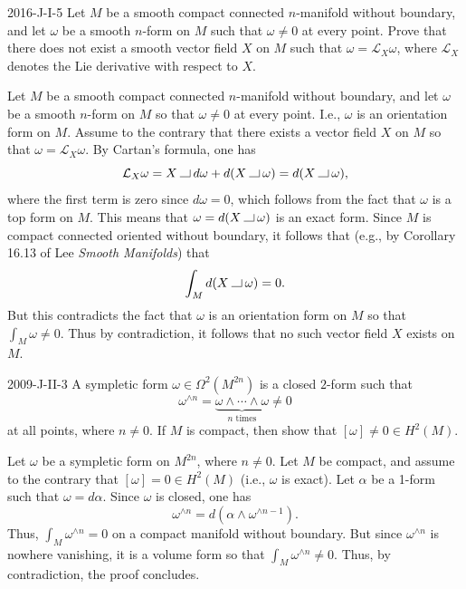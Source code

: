 \documentclass{article}
\newcommand{\contract}{\mathbin{\vrule height 0.4pt width 8pt depth 0pt\vrule height 6pt width 0.4pt depth 0pt}}
\begin{document}
	\begin{prb}{2016-J-I-5}
		Let $M$ be a smooth compact connected $n$-manifold without boundary, and let $\omega$ be a smooth $n$-form on $M$ such that $\omega \neq 0$ at every point. Prove that there does not exist a smooth vector field $X$ on $M$ such that $\omega = \mathcal{L}_{X}\omega$, where $\mathcal{L}_{X}$ denotes the Lie derivative with respect to $X$. 
	\end{prb}
	Let $M$ be a smooth compact connected $n$-manifold without boundary, and let $\omega$ be a smooth $n$-form on $M$ so that $\omega \neq 0$ at every point. I.e., $\omega$ is an orientation form on $M$. Assume to the contrary that there exists a vector field $X$ on $M$ so that $\omega = \mathcal{L}_{X}\omega$. By Cartan's formula, one has 
	\begin{equation*}
		\mathcal{L}_{X}\omega = X \contract d\omega + d(X \contract \omega) = d(X\contract \omega), 
	\end{equation*}
	where the first term is zero since $d\omega = 0$, which follows from the fact that $\omega$ is a top form on $M$. This means that $\omega = d(X \contract \omega)$ is an exact form. Since $M$ is compact connected oriented without boundary, it follows that (e.g., by Corollary 16.13 of Lee \textit{Smooth Manifolds}) that 
	\begin{equation*}
		\int_{M}d(X \contract \omega) = 0. 
	\end{equation*}
	But this contradicts the fact that $\omega$ is an orientation form on $M$ so that $\int_{M}\omega \neq 0$. Thus by contradiction, it follows that no such vector field $X$ exists on $M$. 
	
	\begin{prb}{2009-J-II-3}
		A sympletic form $\omega \in \Omega^{2}(M^{2n})$ is a closed $2$-form such that 
		\begin{equation*}
			\omega^{\wedge n} = \underbrace{\omega \wedge \dotsm \wedge \omega}_{n \text{ times}} \neq 0
		\end{equation*}
		at all points, where $n \neq 0$. If $M$ is compact, then show that $[\omega] \neq 0 \in H^{2}(M)$. 
	\end{prb}
	Let $\omega$ be a sympletic form on $M^{2n}$, where $n \neq 0$. Let $M$ be compact, and assume to the contrary that $[\omega] = 0 \in H^{2}(M)$ (i.e., $\omega$ is exact). Let $\alpha$ be a 1-form such that $\omega = d\alpha$. Since $\omega$ is closed, one has 
	\begin{equation*}
		\omega^{\wedge n} = d(\alpha \wedge \omega^{\wedge n-1}). 
	\end{equation*}
	Thus, $\int_{M} \omega^{\wedge n} = 0$ on a compact manifold without boundary. But since $\omega^{\wedge n}$ is nowhere vanishing, it is a volume form so that $\int_{M}\omega^{\wedge n} \neq 0$. Thus, by contradiction, the proof concludes. 
	
\end{document}
